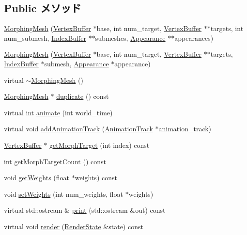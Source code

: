 \subsection*{Public メソッド}
\begin{CompactItemize}
\item 
\hyperlink{classm3g_1_1MorphingMesh_211192cdba0b1d136977403ba4ed0d0c}{MorphingMesh} (\hyperlink{classm3g_1_1VertexBuffer}{VertexBuffer} $\ast$base, int num\_\-target, \hyperlink{classm3g_1_1VertexBuffer}{VertexBuffer} $\ast$$\ast$targets, int num\_\-submesh, \hyperlink{classm3g_1_1IndexBuffer}{IndexBuffer} $\ast$$\ast$submeshes, \hyperlink{classm3g_1_1Appearance}{Appearance} $\ast$$\ast$appearances)
\item 
\hyperlink{classm3g_1_1MorphingMesh_4a2347ee9c813fa1a6eef998f37bf6d5}{MorphingMesh} (\hyperlink{classm3g_1_1VertexBuffer}{VertexBuffer} $\ast$base, int num\_\-target, \hyperlink{classm3g_1_1VertexBuffer}{VertexBuffer} $\ast$$\ast$targets, \hyperlink{classm3g_1_1IndexBuffer}{IndexBuffer} $\ast$submesh, \hyperlink{classm3g_1_1Appearance}{Appearance} $\ast$appearance)
\item 
virtual \hyperlink{classm3g_1_1MorphingMesh_cdafafba64a0167f28f3b66ac4b9d7d6}{$\sim$MorphingMesh} ()
\item 
\hyperlink{classm3g_1_1MorphingMesh}{MorphingMesh} $\ast$ \hyperlink{classm3g_1_1MorphingMesh_7e7b2c3c4c988c6341a5e249bd468f57}{duplicate} () const 
\item 
virtual int \hyperlink{classm3g_1_1MorphingMesh_8aad1ceab4c2a03609c8a42324ce484d}{animate} (int world\_\-time)
\item 
virtual void \hyperlink{classm3g_1_1MorphingMesh_415c0b110f95410ded9b85e5d99a496b}{addAnimationTrack} (\hyperlink{classm3g_1_1AnimationTrack}{AnimationTrack} $\ast$animation\_\-track)
\item 
\hyperlink{classm3g_1_1VertexBuffer}{VertexBuffer} $\ast$ \hyperlink{classm3g_1_1MorphingMesh_44766cc08b595f074d0d698c75f544b4}{getMorphTarget} (int index) const 
\item 
int \hyperlink{classm3g_1_1MorphingMesh_620d9684124201f738a28c7c39641541}{getMorphTargetCount} () const 
\item 
void \hyperlink{classm3g_1_1MorphingMesh_80cef3b2c5e4881567409829de224e46}{getWeights} (float $\ast$weights) const 
\item 
void \hyperlink{classm3g_1_1MorphingMesh_b97015e8aeed76a33582eb11d06e322b}{setWeights} (int num\_\-weights, float $\ast$weights)
\item 
virtual std::ostream \& \hyperlink{classm3g_1_1MorphingMesh_6fea17fa1532df3794f8cb39cb4f911f}{print} (std::ostream \&out) const 
\item 
virtual void \hyperlink{classm3g_1_1MorphingMesh_8babc8a79b78615da51161e94029eea9}{render} (\hyperlink{structm3g_1_1RenderState}{RenderState} \&state) const 
\end{CompactItemize}
